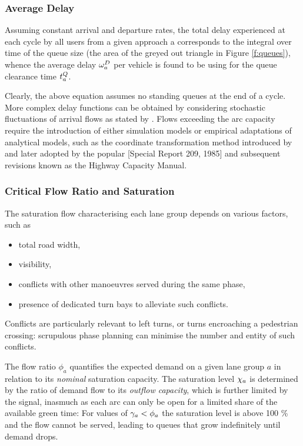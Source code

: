 \subsubsection*{Average Delay}
Assuming constant arrival and departure rates, the total delay experienced at each cycle by all users from a given approach a corresponds to the integral over time of the queue size (the area of the greyed out triangle in Figure \ref{f:queues}), whence the average delay $\omega_{a}^{D}$ per vehicle is found to be
using  for the queue clearance time $t_{a}^Q$.

Clearly, the above equation  assumes no standing queues at the end of a cycle. More complex delay functions can be obtained by considering stochastic fluctuations of arrival flows as stated by \cite{webster1958traffic}. 
Flows exceeding the arc capacity require the introduction of either simulation models or empirical adaptations of analytical models, such as the coordinate transformation method introduced by \cite{kimber1979traffic} and later adopted by the popular [Special Report 209, 1985] and subsequent revisions known as the Highway Capacity Manual.

\subsubsection*{Critical Flow Ratio and Saturation}
The saturation flow characterising each lane group depends on various factors, such as
\begin{itemize}
\item total road width,
\item visibility,
\item conflicts with other manoeuvres served during the same phase,
\item presence of dedicated turn bays to alleviate such conflicts.
\end{itemize} 
Conflicts are particularly relevant to left turns, or turns encroaching a pedestrian crossing: scrupulous phase planning can minimise the number and entity of such conflicts.

The flow ratio $\phi_a$ quantifies the expected demand on a given lane group $a$ in relation to its \emph{nominal} saturation capacity.
The saturation level $\chi_a$ is determined by the ratio of demand flow to its \emph{outflow capacity}, which is further limited by the signal, inasmuch as each arc can only be open for a limited share of the available green time:
For values of $\gamma_{a} < \phi_a$ the saturation level is above 100 \% and the flow cannot be served, leading to queues that grow indefinitely until demand drops.

